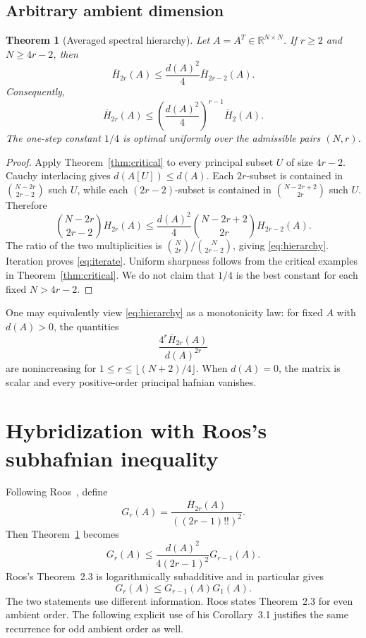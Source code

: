 \documentclass[11pt]{article}
\newtheorem{theorem}{Theorem}
\theoremstyle{remark}\newtheorem{remark}[theorem]{Remark}
\newcommand{\R}{\mathbb R}\newcommand{\op}{\mathrm{op}}
\newcommand{\Hbar}{\overline H}
\begin{document}
\subsection{Arbitrary ambient dimension}
\begin{theorem}[Averaged spectral hierarchy]\label{thm:hierarchy}
Let $A=A^T\in\R^{N\times N}$.  If $r\ge2$ and $N\ge4r-2$, then
\begin{equation}\label{eq:hierarchy}
\boxed{
\Hbar_{2r}(A)\le\frac{d(A)^2}{4}\Hbar_{2r-2}(A).
}
\end{equation}
Consequently,
\begin{equation}\label{eq:iterate}
\boxed{
\Hbar_{2r}(A)\le
\left(\frac{d(A)^2}{4}\right)^{r-1}\Hbar_2(A).
}
\end{equation}
The one-step constant $1/4$ is optimal uniformly over the admissible pairs
$(N,r)$.
\end{theorem}
\begin{proof}
Apply Theorem~\ref{thm:critical} to every principal subset $U$ of size
$4r-2$.  Cauchy interlacing gives $d(A[U])\le d(A)$.  Each $2r$-subset is
contained in $\binom{N-2r}{2r-2}$ such $U$, while each $(2r-2)$-subset is
contained in $\binom{N-2r+2}{2r}$ such $U$.  Therefore
\[
\binom{N-2r}{2r-2}H_{2r}(A)
\le\frac{d(A)^2}{4}
\binom{N-2r+2}{2r}H_{2r-2}(A).
\]
The ratio of the two multiplicities is
$\binom N{2r}/\binom N{2r-2}$, giving \eqref{eq:hierarchy}.  Iteration proves
\eqref{eq:iterate}.  Uniform sharpness follows from the critical examples in
Theorem~\ref{thm:critical}.  We do not claim that $1/4$ is the best constant
for each fixed $N>4r-2$.
\end{proof}

One may equivalently view \eqref{eq:hierarchy} as a monotonicity law: for
fixed $A$ with $d(A)>0$, the quantities
\[
\frac{4^r\Hbar_{2r}(A)}{d(A)^{2r}}
\]
are nonincreasing for $1\le r\le\lfloor(N+2)/4\rfloor$.
When $d(A)=0$, the matrix is scalar and every positive-order principal hafnian vanishes.

\section{Hybridization with Roos's subhafnian inequality}\label{sec:hybrid}
Following Roos~\cite{roos}, define
\begin{equation}\label{eq:G}
G_r(A)=\frac{\Hbar_{2r}(A)}{((2r-1)!!)^2}.
\end{equation}
Then Theorem~\ref{thm:hierarchy} becomes
\begin{equation}\label{eq:spectralG}
\boxed{
G_r(A)\le\frac{d(A)^2}{4(2r-1)^2}G_{r-1}(A).
}
\end{equation}
Roos's Theorem~2.3 is logarithmically subadditive and in particular gives
\begin{equation}\label{eq:roos}
G_r(A)\le G_{r-1}(A)G_1(A).
\end{equation}
The two statements use different information. Roos states Theorem~2.3
for even ambient order. The following explicit use of his Corollary~3.1
justifies the same recurrence for odd ambient order as well.
\end{document}
